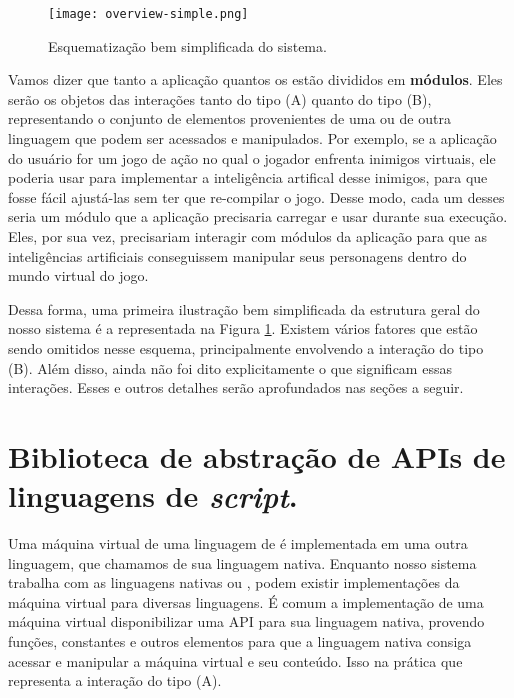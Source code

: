     \begin{figure}[ht]
      \centering
      \texttt{[image: overview-simple.png]}
      \caption{Esquematização bem simplificada do sistema.}
      \label{fig:overview-simple}
    \end{figure}

    Vamos dizer que tanto a aplicação quantos os  estão divididos
    em \textbf{módulos}. Eles serão os objetos das interações tanto do tipo (A)
    quanto do tipo (B), representando o conjunto de elementos provenientes de
    uma ou de outra linguagem que podem ser acessados e manipulados. Por
    exemplo, se a aplicação do usuário for um jogo de ação no qual o jogador
    enfrenta inimigos virtuais, ele poderia usar  para implementar a
    inteligência artifical desse inimigos, para que fosse fácil ajustá-las sem
    ter que re-compilar o jogo. Desse modo, cada um desses  seria um
    módulo que a aplicação precisaria carregar e usar durante sua execução.
    Eles, por sua vez, precisariam interagir com módulos da aplicação para que
    as inteligências artificiais conseguissem manipular seus personagens dentro
    do mundo virtual do jogo.

    Dessa forma, uma primeira ilustração bem simplificada da estrutura geral do
    nosso sistema é a representada na Figura \ref{fig:overview-simple}. Existem
    vários fatores que estão sendo omitidos nesse esquema, principalmente
    envolvendo a interação do tipo (B). Além disso, ainda não foi dito
    explicitamente o que significam essas interações. Esses e outros detalhes
    serão aprofundados nas seções a seguir.
    

  \section{Biblioteca de abstração de APIs de linguagens de \emph{script}.}
  \label{sec:estrutura:opa}
  
  Uma máquina virtual de uma linguagem de \script{} é implementada em uma outra
  linguagem, que chamamos de sua linguagem nativa. Enquanto nosso sistema trabalha
  com as linguagens nativas \C{} ou \CXX{}, podem existir implementações da máquina
  virtual para diversas linguagens. É comum a implementação de uma máquina virtual
  disponibilizar uma API para sua linguagem nativa, provendo funções, constantes
  e outros elementos para que a linguagem nativa consiga acessar e manipular a
  máquina virtual e seu conteúdo. Isso na prática que representa a interação do
  tipo (A).

